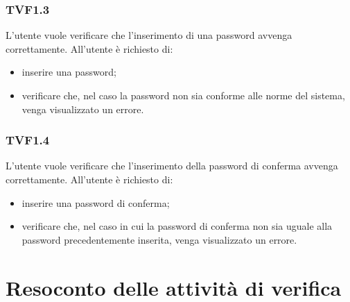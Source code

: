 		\subsubsection{TVF1.3}
			L'utente vuole verificare che l'inserimento di una password avvenga correttamente. All'utente è richiesto di:
			\begin{itemize}
				\item inserire una password;
				\item verificare che, nel caso la password non sia conforme alle norme del sistema, venga visualizzato un errore.
			\end{itemize}
			
		\subsubsection{TVF1.4}
			L'utente vuole verificare che l'inserimento della password di conferma avvenga correttamente. All'utente è richiesto di:
			\begin{itemize}
				\item inserire una password di conferma;
				\item verificare che, nel caso in cui la password di conferma non sia uguale alla password precedentemente inserita, venga visualizzato un errore.
			\end{itemize}
			
\pagebreak


\section{Resoconto delle attività di verifica}
